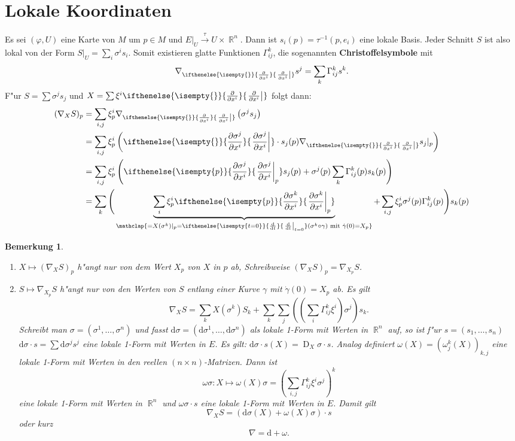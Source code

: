 \documentclass[paper=A4, twoside, chapterprefix=true, bibliography=totoc, headsepline]{scrbook}
\let\temp\phi
\let\phi\varphi
\let\varphi\temp
\let\temp\theta
\let\theta\vartheta
\let\vartheta\temp
\let\temp\epsilon
\let\epsilon\varepsilon
\let\varepsilon\temp
\let\temp\rho
\let\rho\varrho
\let\varrho\temp
\DeclareMathOperator{\R}{\mathbb{R}}
\DeclareMathOperator{\D}{D} %
\newcommand{\dop}{\mathrm{d}}
\newcommand{\X}{\times}
\newcommand{\difffrac}[3][]{\ifthenelse{\isempty{#1}}{\frac{\dop #2}{\dop #3}}{\left. \frac{\dop #2}{\dop #3} \right|_{#1}}}
\newcommand{\pdifffrac}[3][]{\ifthenelse{\isempty{#1}}{\frac{\partial #2}{\partial #3}}{\left. \frac{\partial #2}{\partial #3} \right|_{#1}}}
\theoremstyle{plain}
\theoremstyle{nonumberplain}
\newtheorem{bem}{Bemerkung}
\theoremstyle{empty}
\theoremstyle{break}
\newcommand{\CmIndex}[2][]{\ifthenelse{\isempty{#1}}{\index{#2}}{\index{#1}}#2}
\newcommand{\CmMark}[2][]{\textbf{\CmIndex[#1]{#2}}}
\begin{document}
\section{Lokale Koordinaten}

Es sei $(\phi, U)$ eine Karte von $M$ um $p \in M$ und $E|_U \overset{\tau}{\to} U \X \R^n$. Dann ist $s_i(p) = \tau^{-1}(p, e_i)$ eine lokale Basis.
Jeder Schnitt $S$ ist also lokal von der Form $S|_U = \sum_i \sigma^{i} s_i$.
Somit existieren glatte Funktionen $\Gamma_{ij}^k$, die sogenannten \CmMark{Christoffelsymbole} mit 
\[ \nabla_{\pdifffrac{}{x^{i}}} s^j = \sum_k \Gamma_{ij}^k s^k. \]
F"ur $S = \sum \sigma^j s_j$ und $X = \sum \xi^{i} \pdifffrac{}{x^{i}}$ folgt dann:
\begin{align*}
  (\nabla_XS)_p &= \sum_{i,j} \xi_p^{i} \nabla_{\pdifffrac{}{x^{i}}} \left(\sigma^j s_j\right)\\
  &= \sum_{i,j} \xi_p^{i} \left(\pdifffrac{\sigma^j}{x^{i}} \cdot s_j(p) \nabla_{\pdifffrac{}{x^{i}}} s_j|_p\right)\\
  &= \sum_{i,j} \xi_p^{i} \left(\pdifffrac[p]{\sigma^j}{x^{i}} s_j(p) + \sigma^j(p) \sum_k \Gamma_{ij}^k(p) s_k(p)\right)\\
  &= \sum_k \Bigg(\underbrace{\sum_i \xi_p^{i} \pdifffrac[p]{\sigma^k}{x^{i}}}_{\mathclap{= X(\sigma^k)|_p = \difffrac[t=0]{}{t} (\sigma^k \circ \gamma) \text{ mit } \dot\gamma(0) = X_p}} + \sum_{i,j} \xi_p^{i} \sigma^j(p) \Gamma_{ij}^k(p)\Bigg) s_k(p)
\end{align*}

\begin{bem}
  \begin{enumerate}[label=(\arabic*),leftmargin=*]
  \item $X \mapsto (\nabla_XS)_p$ h"angt nur von dem Wert $X_p$ von  $X$ in $p$ ab, Schreibweise $(\nabla_XS)_p = \nabla_{X_p}S$.
  \item $S \mapsto \nabla_{X_p}S$ h"angt nur von den Werten von $S$ entlang einer Kurve $\gamma$ mit $\dot\gamma(0) = X_p$ ab.
    Es gilt
    \[ \nabla_XS = \sum_k X(\sigma^k)S_k + \sum_k \sum_j\left(\left(\sum_i \Gamma_{ij}^k \xi^{i}\right) \sigma^j\right) s_k. \]
    Schreibt man $\sigma = (\sigma^1,\ldots ,\sigma^n)$ und fasst $\dop \sigma = (\dop \sigma^1,\ldots ,\dop \sigma^n)$ als lokale 1-Form mit Werten in $\R^n$ auf, so ist f"ur $s=(s_1,\ldots ,s_n)$ $\dop\sigma \cdot s = \sum \dop \sigma^j s^j$ eine lokale 1-Form mit Werten in $E$. Es gilt: $\dop \sigma \cdot s(X) = \D_X \sigma \cdot s$.
    Analog definiert $\omega(X) = (\omega_j^k(X))_{k,j}$ eine lokale 1-Form mit Werten in den reellen $(n\X n)$-Matrizen.
    Dann ist 
    \[ \omega \sigma : X \mapsto \omega(X) \sigma = \left( \sum_{i,j} \Gamma_{ij}^k \xi^{i} \sigma^j \right)^k \]
    eine lokale 1-Form mit Werten in $\R^n$ und $\omega\sigma \cdot s$ eine lokale 1-Form mit Werten in $E$. Damit gilt
    \[ \nabla_XS = (\dop \sigma(X) + \omega(X) \sigma) \cdot s \]
    oder kurz
    \[ \nabla = \dop + \omega. \]
  \end{enumerate}
\end{bem}
\end{document}
